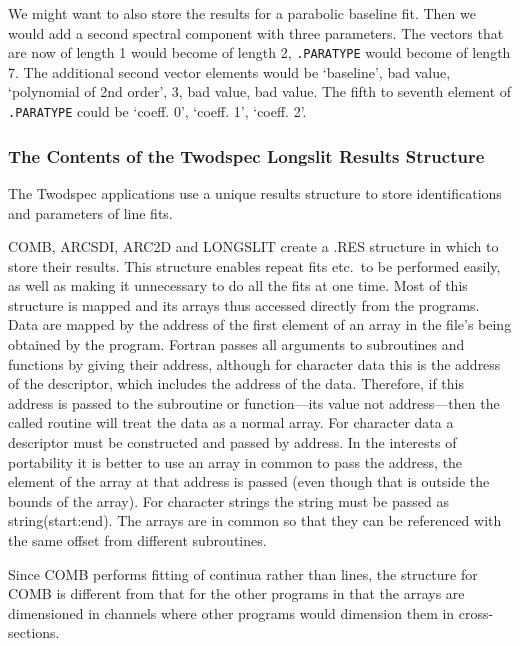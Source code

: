 \documentclass[11pt,twoside]{article}
\newcommand{\xlabel}[1]{}
\begin{document}
\begin{enumerate}
   We might want to also store the results for a parabolic baseline
   fit. Then we would add a second spectral component with three
   parameters. The vectors that are now of length 1 would become of
   length 2, {\tt .PARATYPE} would become of length 7. The additional
   second vector elements would be `baseline', bad value, `polynomial
   of 2nd order', 3, bad value, bad value. The fifth to seventh element
   of {\tt .PARATYPE} could be `coeff. 0', `coeff. 1', `coeff. 2'.

\end{enumerate}

\subsubsection{\xlabel{the_contents_of_the_longslit_structure}\label{the_contents_of_the_longslit_structure}%
The Contents of the Twodspec Longslit Results Structure}
\label{ap.res}

The Twodspec applications use a unique results structure to store
identifications and parameters of line fits.

COMB, ARCSDI, ARC2D and LONGSLIT create a .RES structure in which to
store their results.  This structure enables repeat fits etc.\ to be
performed easily, as well as making it unnecessary to do all the fits at
one time.  Most of this structure is mapped and its arrays thus accessed
directly from the programs.  Data are mapped by the address of the
first element of an array in the file's being obtained by the program.
Fortran passes all arguments to subroutines and functions by giving
their address, although for character data this is the address of the
descriptor, which includes the address of the data.  Therefore, if
this address is passed to the subroutine or function---its value not
address---then the called routine will treat the data as a normal
array.  For character data a descriptor must be constructed and passed
by address.  In the interests of portability it is better to use an
array in common to pass the address, the element of the array at that
address is passed (even though that is outside the bounds of the
array). For character strings the string must be passed as
string(start:end). The arrays are in common so that they can be
referenced with the same offset from different subroutines.

Since COMB performs fitting of continua rather than lines, the structure
for COMB is different from that for the other programs in that the arrays
are dimensioned in channels where other programs would dimension them in
cross-sections.
\end{document}
